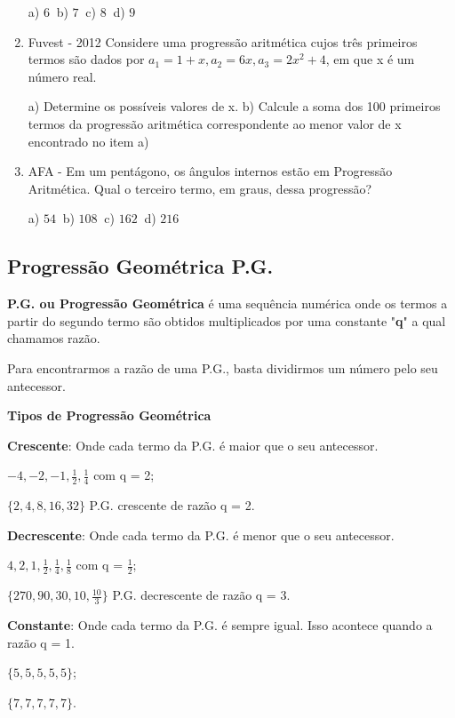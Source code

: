 \begin{multicols*}{2}
\begin{enumerate}
              a) $6 \ $ b) $7 \ $ c) $8 \ $ d) $9 $

        \item Fuvest - 2012 Considere uma progressão aritmética cujos três primeiros termos são dados por $ a_1 = 1 + x, a_2 = 6x, a_3 = 2x^2 + 4$, em que x é um número real.

              a) Determine os possíveis valores de x.
              b) Calcule a soma dos 100 primeiros termos da progressão aritmética correspondente ao menor valor de x encontrado no item a)

        \item AFA - Em um pentágono, os ângulos internos estão em Progressão Aritmética. Qual o terceiro termo, em graus, dessa progressão?

              a) $54 \ $ b) $108 \ $ c) $162 \ $ d) $216 $

    \end{enumerate}

    \subsection{Progressão Geométrica P.G.}

    \textbf{P.G. ou Progressão Geométrica} é uma sequência numérica onde os termos a partir do segundo termo são obtidos multiplicados por uma constante "\textbf{q}" a qual chamamos razão.

    Para encontrarmos a razão de uma P.G., basta dividirmos um número pelo seu antecessor.

    \textbf{Tipos de Progressão Geométrica}

    \textbf{Crescente}: Onde cada termo da P.G. é maior que o seu antecessor.

    $ -4, -2, -1, \frac{1}{2}, \frac{1}{4} $ com q = 2;

    $ \{ 2, 4, 8, 16, 32 \} $ P.G. crescente de razão q = 2.

    \textbf{Decrescente}: Onde cada termo da P.G. é menor que o seu antecessor.

    $ 4, 2, 1, \frac{1}{2}, \frac{1}{4}, \frac{1}{8} $ com q = $\frac{1}{2}$;

    $ \{ 270, 90, 30, 10, \frac{10}{3}\} $ P.G. decrescente de razão q = 3.

    \textbf{Constante}: Onde cada termo da P.G. é sempre igual. Isso acontece quando a razão q = 1.

    $\{ 5, 5, 5, 5, 5 \}$;

    $\{ 7, 7, 7, 7,7 \}$.


\end{multicols*}
